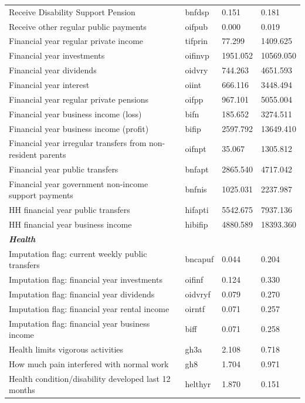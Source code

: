 \documentclass[12pt, a4paper]{article}
\begin{document}
\begin{longtable}{p{} C{0.15\textwidth} C{0.15\textwidth} C{0.15\textwidth}}
Receive Disability Support Pension 	& 	bnfdsp	 & 	0.151	 & 	0.181	 \\
Receive other regular public payments 	& 	oifpub	 & 	0.000	 & 	0.019	 \\
Financial year regular private income 	& 	tifprin	 & 	77.299	 & 	1409.625	 \\
Financial year investments 	& 	oifinvp	 & 	1951.052	 & 	10569.050	 \\
Financial year dividends 	& 	oidvry	 & 	744.263	 & 	4651.593	 \\
Financial year interest 	& 	oiint	 & 	666.116	 & 	3448.494	 \\
Financial year regular private pensions 	& 	oifpp	 & 	967.101	 & 	5055.004	 \\
Financial year business income (loss) 	& 	bifn	 & 	185.652	 & 	3274.511	 \\
Financial year business income (profit) 	& 	bifip	 & 	2597.792	 & 	13649.410	 \\
Financial year irregular transfers from non-resident parents 	& 	oifnpt	 & 	35.067	 & 	1305.812	 \\
Financial year public transfers 	& 	bnfapt	 & 	2865.540	 & 	4717.042	 \\
Financial year government non-income support payments 	& 	bnfnis	 & 	1025.031	 & 	2237.987	 \\
HH financial year public transfers 	& 	hifapti	 & 	5542.675	 & 	7937.136	 \\
HH financial year business income 	& 	hibifip	 & 	4880.589	 & 	18393.360	 \\
\textbf{\textit{Health}} 	& 		 & 		 & 		 \\
Imputation flag: current weekly public transfers 	& 	bncapuf	 & 	0.044	 & 	0.204	 \\
Imputation flag: financial year investments 	& 	oifinf	 & 	0.124	 & 	0.330	 \\
Imputation flag: financial year dividends 	& 	oidvryf	 & 	0.079	 & 	0.270	 \\
Imputation flag: financial year rental income 	& 	oirntf	 & 	0.071	 & 	0.257	 \\
Imputation flag: financial year business income 	& 	biff	 & 	0.071	 & 	0.258	 \\
Health limits vigorous activities 	& 	gh3a	 & 	2.108	 & 	0.718	 \\
How much pain interfered with normal work 	& 	gh8	 & 	1.704	 & 	0.971	 \\
Health condition/disability developed last 12 months 	& 	helthyr	 & 	1.870	 & 	0.151	 \\

\end{longtable}
\end{document}
